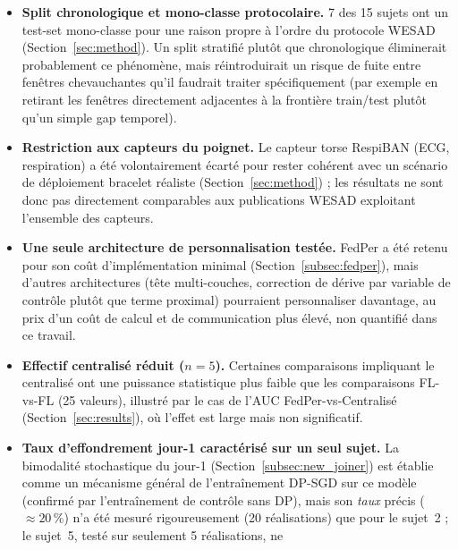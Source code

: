 \documentclass{acmart}
\begin{document}
\begin{itemize}
  résultat le plus faible des trois, mais l'écart n'est pas significatif
  (test $t$ apparié $\mu=0$ vs $\mu=0{,}05$, $p=0{,}44$ ; $\mu=0{,}1$ vs
  $\mu=0{,}05$, $p=0{,}23$) : avec seulement 3 graines, cette ablation est
  sous-dimensionnée pour trancher, mais suffit à indiquer qu'une
  ré-optimisation de $\mu$ sur une grille complète serait une piste
  raisonnable, pas nécessairement superflue.
  \item \textbf{Split chronologique et mono-classe protocolaire.} 7 des 15
  sujets ont un test-set mono-classe pour une raison propre à l'ordre du
  protocole WESAD (Section~\ref{sec:method}). Un split stratifié plutôt que
  chronologique éliminerait probablement ce phénomène, mais réintroduirait un
  risque de fuite entre fenêtres chevauchantes qu'il faudrait traiter
  spécifiquement (par exemple en retirant les fenêtres directement
  adjacentes à la frontière train/test plutôt qu'un simple gap temporel).
  \item \textbf{Restriction aux capteurs du poignet.} Le capteur torse
  RespiBAN (ECG, respiration) a été volontairement écarté pour rester
  cohérent avec un scénario de déploiement bracelet réaliste
  (Section~\ref{sec:method}) ; les résultats ne sont donc pas directement
  comparables aux publications WESAD exploitant l'ensemble des capteurs.
  \item \textbf{Une seule architecture de personnalisation testée.} FedPer
  a été retenu pour son coût d'implémentation minimal
  (Section~\ref{subsec:fedper}), mais d'autres architectures (tête
  multi-couches, correction de dérive par variable de contrôle plutôt que
  terme proximal) pourraient personnaliser davantage, au prix d'un coût de
  calcul et de communication plus élevé, non quantifié dans ce travail.
  \item \textbf{Effectif centralisé réduit ($n=5$).} Certaines comparaisons
  impliquant le centralisé ont une puissance statistique plus faible que les
  comparaisons FL-vs-FL (25 valeurs), illustré par le cas de l'AUC
  FedPer-vs-Centralisé (Section~\ref{sec:results}), où l'effet est large mais
  non significatif.
  \item \textbf{Taux d'effondrement jour-1 caractérisé sur un seul sujet.}
  La bimodalité stochastique du jour-1 (Section~\ref{subsec:new_joiner}) est
  établie comme un mécanisme général de l'entraînement DP-SGD sur ce modèle
  (confirmé par l'entraînement de contrôle sans DP), mais son \emph{taux}
  précis ($\approx 20\,\%$) n'a été mesuré rigoureusement (20 réalisations)
  que pour le sujet~2 ; le sujet~5, testé sur seulement 5 réalisations, ne

\end{itemize}
\end{document}
